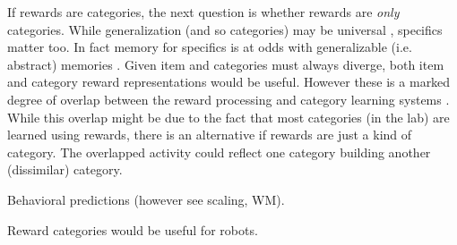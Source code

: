\documentclass[doc,12pt]{apa}        %
\begin{document}
If rewards are categories, the next question is whether rewards are \emph{only} categories.  While generalization (and so categories) may be universal \cite{Shepard:1987p9102}, specifics matter too.  In fact memory for specifics is at odds with generalizable (i.e. abstract) memories \cite{Atallah:2004p5466}. Given item and categories must always diverge, both item and category reward representations would be useful.  However these is a marked degree of overlap between the reward processing and category learning systems \cite{Seger:2010p7189,Ashby:2011p9148}.  While this overlap might be due to the fact that most categories (in the lab) are learned using rewards, there is an alternative if rewards are just a kind of category.  The overlapped activity could reflect one category building another (dissimilar) category.

Behavioral predictions (however see scaling, WM).

Reward categories would be useful for robots.

\clearpage
\newpage

\end{document}
